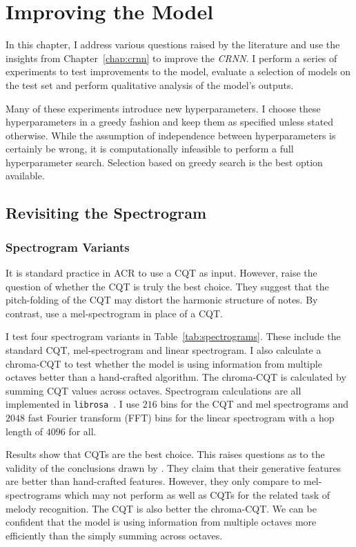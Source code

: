 \chapter{Improving the Model}\label{chap:model_improvements}

In this chapter, I address various questions raised by the literature and use the insights from Chapter~\ref{chap:crnn} to improve the \emph{CRNN}. I perform a series of experiments to test improvements to the model, evaluate a selection of models on the test set and perform qualitative analysis of the model's outputs.

Many of these experiments introduce new hyperparameters. I choose these hyperparameters in a greedy fashion and keep them as specified unless stated otherwise. While the assumption of independence between hyperparameters is certainly be wrong, it is computationally infeasible to perform a full hyperparameter search. Selection based on greedy search is the best option available.

\section{Revisiting the Spectrogram}\label{sec:spectrogram-results}

\subsection{Spectrogram Variants}\label{sec:spectrogram-variants}

It is standard practice in ACR to use a CQT as input. However, \citet{20YearsofACR} raise the question of whether the CQT is truly the best choice. They suggest that the pitch-folding of the CQT may distort the harmonic structure of notes. By contrast, \citet{MelodyTranscriptionViaGenerativePreTraining} use a mel-spectrogram in place of a CQT. 

I test four spectrogram variants in Table~\ref{tab:spectrograms}. These include the standard CQT, mel-spectrogram and linear spectrogram. I also calculate a chroma-CQT to test whether the model is using information from multiple octaves better than a hand-crafted algorithm. The chroma-CQT is calculated by summing CQT values across octaves. Spectrogram calculations are all implemented in \texttt{librosa}~\citep{librosa}. I use $216$ bins for the CQT and mel spectrograms and $2048$ fast Fourier transform (FFT) bins for the linear spectrogram with a hop length of $4096$ for all. 

Results show that CQTs are the best choice. This raises questions as to the validity of the conclusions drawn by \citet{MelodyTranscriptionViaGenerativePreTraining}. They claim that their generative features are better than hand-crafted features. However, they only compare to mel-spectrograms which may not perform as well as CQTs for the related task of melody recognition. The CQT is also better the chroma-CQT. We can be confident that the model is using information from multiple octaves more efficiently than the simply summing across octaves.

